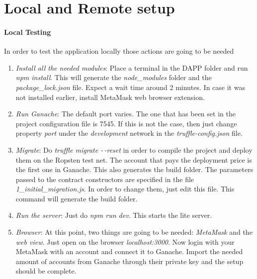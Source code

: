 \documentclass[11pt, a4paper]{report}
\begin{document}
\section*{Local and Remote setup}
	\paragraph*{Local Testing}
	In order to test the application locally those actions are going to be needed
	\begin{enumerate}
		\item \emph{Install all the needed modules}: Place a terminal in the DAPP folder and run \emph{npm install}. This will generate the \emph{node\_modules} folder and the \emph{package\_lock.json} file. Expect a wait time around 2 minutes. In case it was not installed earlier, install MetaMask web browser extension.
		\item \emph{Run Ganache}: The default port varies. The one that has been set in the project configuration file is 7545. If this is not the case, then just change property \emph{port} under the \emph{development} network in the \emph{truffle-config.json} file.
		\item \emph{Migrate}: Do \emph{truffle migrate -\,-reset} in order to compile the project and deploy them on the Ropsten test net. The account that pays the deployment price is the first one in Ganache. This also generates the build folder. The parameters passed to the contract constructors are specified in the file \emph{1\_initial\_migration.js}. In order to change them, just edit this file. This command will generate the build folder.
		\item \emph{Run the server}: Just do \emph{npm run dev}. This starts the lite server.
		\item \emph{Browser}: At this point, two things are going to be needed: \emph{MetaMask} and the \emph{web view}. Just open on the browser \emph{localhost:3000}. Now login with your MetaMask with an account and connect it to Ganache. Import the needed amount of accounts from Ganache through their private key and the setup should be complete.
	\end{enumerate}
\end{document}
